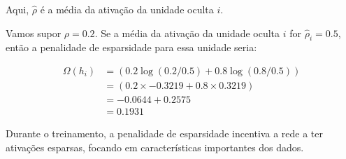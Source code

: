 \begin{apendicesenv}
		
		\par Aqui, $ \hat{\rho} $ é a média da ativação da unidade oculta $ i $.

		\par  Vamos supor $ \rho = 0.2 $. Se a média da ativação da unidade oculta $ i $ for $ \hat{\rho}_i = 0.5 $, então a penalidade de esparsidade para essa unidade seria:
		
		\begin{equation}
			\begin{aligned}
				\Omega(h_i) &= (0.2 \log(0.2 / 0.5) + 0.8 \log(0.8 / 0.5)) \\
							&= (0.2 \times -0.3219 + 0.8 \times 0.3219) \\
							&= -0.0644 + 0.2575 \\
							&= 0.1931 
			\end{aligned}
		\end{equation}
		\par Durante o treinamento, a penalidade de esparsidade incentiva a rede a ter ativações esparsas, focando em características importantes dos dados.

\end{apendicesenv}









